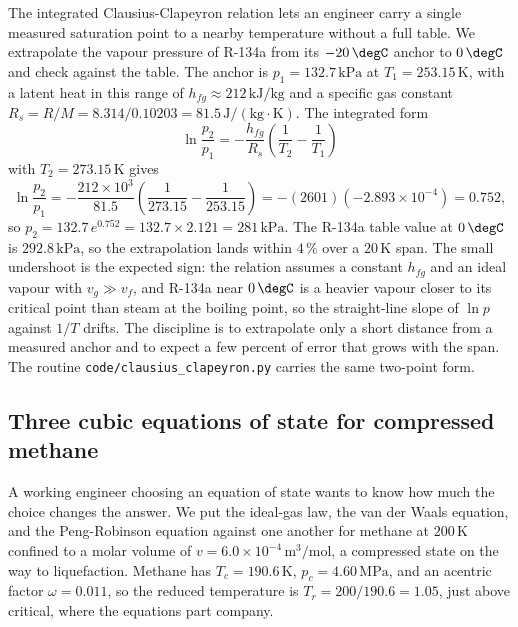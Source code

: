 The integrated Clausius-Clapeyron relation lets an engineer carry a
single measured saturation point to a nearby temperature without a full
table. We extrapolate the vapour pressure of R-134a from its
$-20\,\degC$ anchor to $0\,\degC$ and check against the table. The anchor
is $p_1 = 132.7\,\text{kPa}$ at $T_1 = 253.15\,\si{\kelvin}$, with a
latent heat in this range of $h_{fg} \approx 212\,\text{kJ}/\text{kg}$
and a specific gas constant $R_s = R/M = 8.314/0.10203 = 81.5\,\text{J}/
(\text{kg}\cdot\si{\kelvin})$. The integrated form
\[
\ln\frac{p_2}{p_1} = -\frac{h_{fg}}{R_s}\left(\frac{1}{T_2} -
\frac{1}{T_1}\right)
\]
with $T_2 = 273.15\,\si{\kelvin}$ gives
\[
\ln\frac{p_2}{p_1} = -\frac{212\times 10^3}{81.5}\left(\frac{1}{273.15}
- \frac{1}{253.15}\right) = -(2601)(-2.893\times 10^{-4}) = 0.752,
\]
so $p_2 = 132.7\, e^{0.752} = 132.7\times 2.121 = 281\,\text{kPa}$. The
R-134a table value at $0\,\degC$ is $292.8\,\text{kPa}$, so the
extrapolation lands within $4\,\%$ over a $20\,\si{\kelvin}$ span. The
small undershoot is the expected sign: the relation assumes a constant
$h_{fg}$ and an ideal vapour with $v_g \gg v_f$, and R-134a near
$0\,\degC$ is a heavier vapour closer to its critical point than steam at
the boiling point, so the straight-line slope of $\ln p$ against $1/T$
drifts. The discipline is to extrapolate only a short distance from a
measured anchor and to expect a few percent of error that grows with the
span. The routine \texttt{code/clausius\_clapeyron.py} carries the same
two-point form.

\subsection{Three cubic equations of state for compressed methane}

A working engineer choosing an equation of state wants to know how much
the choice changes the answer. We put the ideal-gas law, the van der
Waals equation, and the Peng-Robinson equation against one another for
methane at $200\,\si{\kelvin}$ confined to a molar volume of $v =
6.0\times 10^{-4}\,\text{m}^3/\text{mol}$, a compressed state on the way
to liquefaction. Methane has $T_c = 190.6\,\si{\kelvin}$, $p_c =
4.60\,\text{MPa}$, and an acentric factor $\omega = 0.011$, so the
reduced temperature is $T_r = 200/190.6 = 1.05$, just above critical,
where the equations part company.


